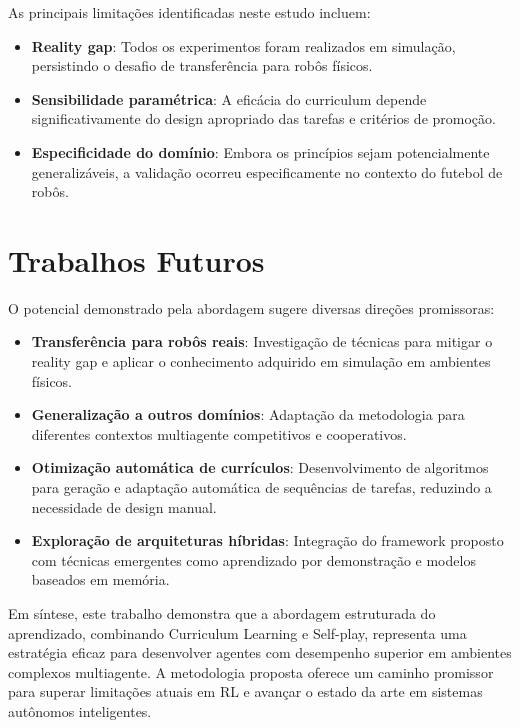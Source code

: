 As principais limitações identificadas neste estudo incluem:

\begin{itemize}
    \item \textbf{Reality gap}: Todos os experimentos foram realizados em simulação, persistindo o desafio de transferência para robôs físicos.
    
    \item \textbf{Sensibilidade paramétrica}: A eficácia do curriculum depende significativamente do design apropriado das tarefas e critérios de promoção.
    
    \item \textbf{Especificidade do domínio}: Embora os princípios sejam potencialmente generalizáveis, a validação ocorreu especificamente no contexto do futebol de robôs.
\end{itemize}

\section{Trabalhos Futuros}

O potencial demonstrado pela abordagem sugere diversas direções promissoras:

\begin{itemize}
    \item \textbf{Transferência para robôs reais}: Investigação de técnicas para mitigar o reality gap e aplicar o conhecimento adquirido em simulação em ambientes físicos.
    
    \item \textbf{Generalização a outros domínios}: Adaptação da metodologia para diferentes contextos multiagente competitivos e cooperativos.
    
    \item \textbf{Otimização automática de currículos}: Desenvolvimento de algoritmos para geração e adaptação automática de sequências de tarefas, reduzindo a necessidade de design manual.
    
    \item \textbf{Exploração de arquiteturas híbridas}: Integração do framework proposto com técnicas emergentes como aprendizado por demonstração e modelos baseados em memória.
\end{itemize}

Em síntese, este trabalho demonstra que a abordagem estruturada do aprendizado, combinando Curriculum Learning e Self-play, representa uma estratégia eficaz para desenvolver agentes com desempenho superior em ambientes complexos multiagente. A metodologia proposta oferece um caminho promissor para superar limitações atuais em RL e avançar o estado da arte em sistemas autônomos inteligentes.

